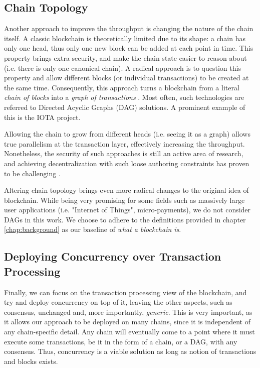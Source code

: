\subsection{Chain Topology}

Another approach to improve the throughput is changing the nature of the chain itself. A classic blockchain is theoretically
limited due to its shape: a chain has only one head, thus only one new block can be added at each
point in time. This property brings extra security, and make the chain state easier to reason
about (i.e. there is only one canonical chain). A radical approach is to question this property and
allow different blocks (or individual transactions) to be created at the same time. Consequently,
this approach turns a blockchain from a literal \textit{chain of blocks} into a \textit{graph of
transactions} \cite{pervezComparativeAnalysisDAGBased2018}. Most often, such technologies are
referred to Directed Acyclic Graphs (DAG) solutions. A prominent example of this is the IOTA
project\cite{mIOTANextGenerationBlock2018}.

Allowing the chain to grow from different heads (i.e. seeing it as a graph) allows true parallelism
at the transaction layer, effectively increasing the throughput. Nonetheless, the security of such
approaches is still an active area of research, and achieving decentralization with such loose
authoring constraints has proven to be challenging \cite{sompolinskySPECTREFastScalable2016}.

Altering chain topology brings even more radical changes to the original idea of blockchain.
While being very promising for some fields such as massively large user applications (i.e. "Internet
of Things", micro-payments), we do not consider DAGs in this work. We choose to adhere to the
definitions provided in chapter \ref{chap:background} as our baseline of \textit{what a blockchain
is}.

\subsection{Deploying Concurrency over Transaction Processing}
\label{chap_approach:subsec:out_of_box_concurrency}

Finally, we can focus on the transaction processing view of the blockchain, and try and deploy
concurrency on top of it, leaving the other aspects, such as consensus, unchanged and, more
importantly, \textit{generic}. This is very important, as it allows our approach to be deployed on
many chains, since it is independent of any chain-specific detail. Any chain will eventually come to
a point where it must execute some transactions, be it in the form of a chain, or a DAG, with any
consensus. Thus, concurrency is a viable solution as long as notion of transactions and blocks exists.

